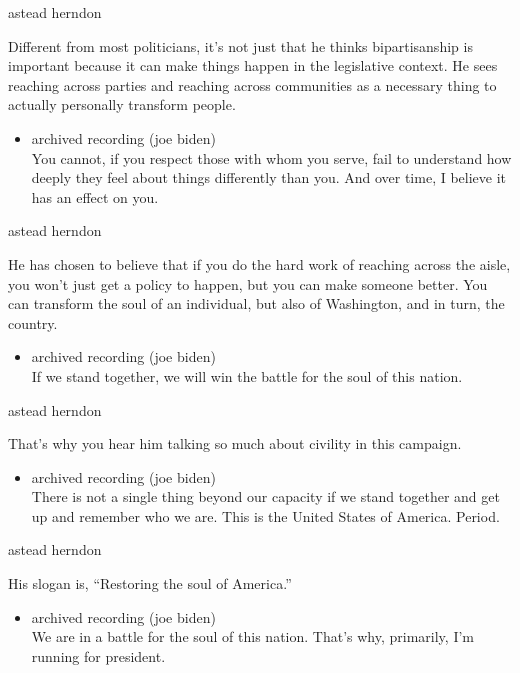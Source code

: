 astead herndon

Different from most politicians, it's not just that he thinks
bipartisanship is important because it can make things happen in the
legislative context. He sees reaching across parties and reaching across
communities as a necessary thing to actually personally transform
people.

\begin{itemize}
\tightlist
\item
  archived recording (joe biden)\\
  You cannot, if you respect those with whom you serve, fail to
  understand how deeply they feel about things differently than you. And
  over time, I believe it has an effect on you.
\end{itemize}

astead herndon

He has chosen to believe that if you do the hard work of reaching across
the aisle, you won't just get a policy to happen, but you can make
someone better. You can transform the soul of an individual, but also of
Washington, and in turn, the country.

\begin{itemize}
\tightlist
\item
  archived recording (joe biden)\\
  If we stand together, we will win the battle for the soul of this
  nation.
\end{itemize}

astead herndon

That's why you hear him talking so much about civility in this campaign.

\begin{itemize}
\tightlist
\item
  archived recording (joe biden)\\
  There is not a single thing beyond our capacity if we stand together
  and get up and remember who we are. This is the United States of
  America. Period.
\end{itemize}

astead herndon

His slogan is, ``Restoring the soul of America.''

\begin{itemize}
\tightlist
\item
  archived recording (joe biden)\\
  We are in a battle for the soul of this nation. That's why, primarily,
  I'm running for president.
\end{itemize}

